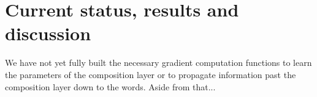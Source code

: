 \documentclass[10pt,letterpaper]{article}
\begin{document}


\section{Current status, results and discussion}

We have not yet fully built the necessary gradient computation functions to learn the parameters of the composition layer or to propagate information past the composition layer down to the words. Aside from that... 








\setlength{\bibleftmargin}{.125in}
\setlength{\bibindent}{-\bibleftmargin}


\end{document}
